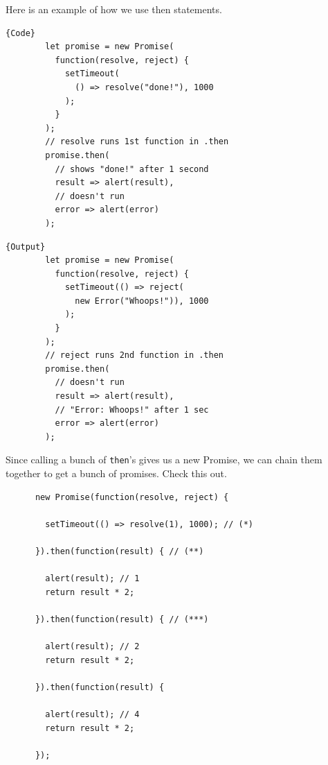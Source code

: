 \documentclass{article}
\newcounter{example}[section]
\begin{document}
    \begin{example}
      \label{ex:chaining-then-statements}
      Here is an example of how we use then statements. 
      
      \noindent\begin{minipage}{.5\textwidth}
      \begin{lstlisting}[]{Code}
        let promise = new Promise(
          function(resolve, reject) {
            setTimeout(
              () => resolve("done!"), 1000
            );
          }
        );
        // resolve runs 1st function in .then
        promise.then(
          // shows "done!" after 1 second
          result => alert(result), 
          // doesn't run
          error => alert(error) 
        );
      \end{lstlisting}
      \end{minipage}
      \hfill
      \begin{minipage}{.49\textwidth}
      \begin{lstlisting}[]{Output}
        let promise = new Promise(
          function(resolve, reject) {
            setTimeout(() => reject(
              new Error("Whoops!")), 1000
            );
          }
        );
        // reject runs 2nd function in .then
        promise.then(
          // doesn't run
          result => alert(result), 
          // "Error: Whoops!" after 1 sec 
          error => alert(error) 
        ); 
      \end{lstlisting}
      \end{minipage}
    \end{example}

    Since calling a bunch of \texttt{then}'s gives us a new Promise, we can chain them together to get a bunch of promises. Check this out. 

    \begin{lstlisting}
      new Promise(function(resolve, reject) {

        setTimeout(() => resolve(1), 1000); // (*)

      }).then(function(result) { // (**)

        alert(result); // 1
        return result * 2;

      }).then(function(result) { // (***)

        alert(result); // 2
        return result * 2;

      }).then(function(result) {

        alert(result); // 4
        return result * 2;

      });
    \end{lstlisting}
\end{document}
